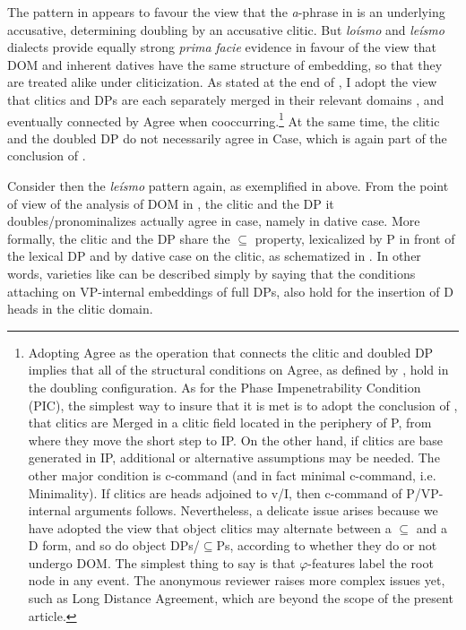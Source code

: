 \documentclass[output=paper,colorlinks,citecolor=brown,modfonts,nonflat]{langsci/langscibook}
\begin{document}
The pattern in  appears to favour the view that the \textit{a}-phrase in  is an underlying accusative, determining doubling by an accusative clitic. But \textit{loísmo} and \textit{leísmo} dialects provide equally strong \textit{prima} \textit{facie} evidence in favour of the view that DOM and inherent datives have the same structure of embedding, so that they are treated alike under cliticization. As stated at the end of , I adopt the view that clitics and DPs are each separately merged in their relevant domains \citep{Sportiche1996}, and eventually connected by  Agree when cooccurring.\footnote{Adopting Agree as the operation that connects the clitic and doubled DP implies that all of the structural conditions on Agree, as defined by \citet{Chomsky2000}, hold in the doubling configuration. As for the Phase Impenetrability Condition (PIC), the simplest way to insure that it is met is to adopt the conclusion of \citet{Sportiche1996}, that clitics are Merged in a clitic field located in the periphery of {\liv}P, from where they move the short step to IP. On the other hand, if clitics are base generated in IP, additional or alternative assumptions may be needed. The other major condition is c-command (and in fact minimal c-command, i.e. Minimality). If clitics are heads adjoined to v/I, then c-command of {\liv}P/VP-internal arguments follows. Nevertheless, a delicate issue arises because we have adopted the view that object clitics may alternate between a \textrm{${\subseteq}$} and a D form, and so do object DPs/\textrm{${\subseteq}$}Ps, according to whether they do or not undergo DOM.  The simplest thing to say is that $\varphi $-features label the root node in any event. The anonymous reviewer raises more complex issues yet, such as Long Distance Agreement, which are beyond the scope of the present article.}{} At the same time, the clitic and the doubled DP do not necessarily agree in Case, which is again part of the conclusion of .

Consider then the \textit{leísmo} pattern again, as exemplified in  above. From the point of view of the analysis of DOM in , the clitic and the DP it doubles/pronominalizes actually agree in case, namely in dative case. More formally, the clitic and the DP share the ${\subseteq}$ property, lexicalized by P in front of the lexical DP and by dative case on the clitic, as schematized in . In other words, varieties like  can be described simply by saying that the conditions attaching on VP-internal embeddings of full DPs, also hold for the insertion of D heads in the clitic domain.
\end{document}
